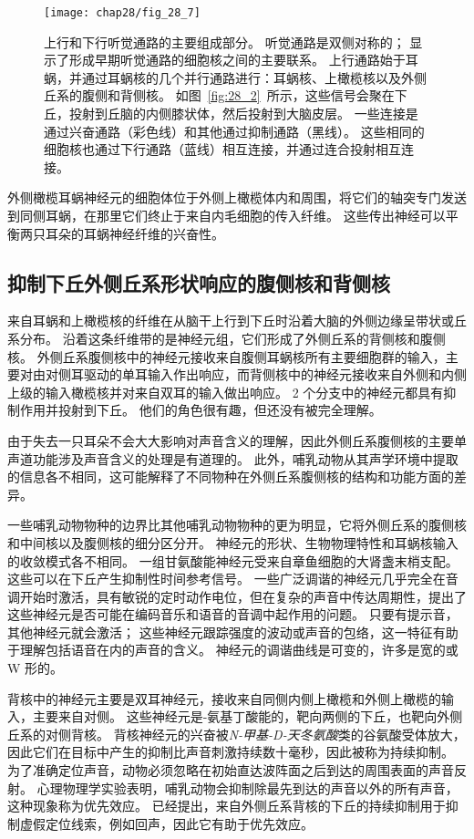 \begin{figure}[htbp]
	\centering
	\texttt{[image: chap28/fig\_28\_7]}
	\caption{上行和下行听觉通路的主要组成部分。
		听觉通路是双侧对称的；
		显示了形成早期听觉通路的细胞核之间的主要联系。
		上行通路始于耳蜗，并通过耳蜗核的几个并行通路进行：耳蜗核、上橄榄核以及外侧丘系的腹侧和背侧核。
		如图~\ref{fig:28_2}~所示，这些信号会聚在下丘，投射到丘脑的内侧膝状体，然后投射到大脑皮层。
		一些连接是通过兴奋通路（彩色线）和其他通过抑制通路（黑线）。 
		这些相同的细胞核也通过下行通路（蓝线）相互连接，并通过连合投射相互连接。}
	\label{fig:28_7}
\end{figure}


外侧橄榄耳蜗神经元的细胞体位于外侧上橄榄体内和周围，将它们的轴突专门发送到同侧耳蜗，在那里它们终止于来自内毛细胞的传入纤维。
这些传出神经可以平衡两只耳朵的耳蜗神经纤维的兴奋性\cite{darrow2006cochlear}。



\subsection{抑制下丘外侧丘系形状响应的腹侧核和背侧核}

来自耳蜗和上橄榄核的纤维在从脑干上行到下丘时沿着大脑的外侧边缘呈带状或丘系分布。
沿着这条纤维带的是神经元组，它们形成了外侧丘系的背侧核和腹侧核。
外侧丘系腹侧核中的神经元接收来自腹侧耳蜗核所有主要细胞群的输入，主要对由对侧耳驱动的单耳输入作出响应，而背侧核中的神经元接收来自外侧和内侧上级的输入橄榄核并对来自双耳的输入做出响应。
2 个分支中的神经元都具有抑制作用并投射到下丘。
他们的角色很有趣，但还没有被完全理解。


由于失去一只耳朵不会大大影响对声音含义的理解，因此外侧丘系腹侧核的主要单声道功能涉及声音含义的处理是有道理的。
此外，哺乳动物从其声学环境中提取的信息各不相同，这可能解释了不同物种在外侧丘系腹侧核的结构和功能方面的差异。


一些哺乳动物物种的边界比其他哺乳动物物种的更为明显，它将外侧丘系的腹侧核和中间核以及腹侧核的细分区分开。
神经元的形状、生物物理特性和耳蜗核输入的收敛模式各不相同。
一组甘氨酸能神经元受来自章鱼细胞的大肾盏末梢支配。 
这些可以在下丘产生抑制性时间参考信号。
一些广泛调谐的神经元几乎完全在音调开始时激活，具有敏锐的定时动作电位，但在复杂的声音中传达周期性，提出了这些神经元是否可能在编码音乐和语音的音调中起作用的问题。
只要有提示音，其他神经元就会激活； 
这些神经元跟踪强度的波动或声音的包络，这一特征有助于理解包括语音在内的声音的含义。
神经元的调谐曲线是可变的，许多是宽的或 W 形的。


背核中的神经元主要是双耳神经元，接收来自同侧内侧上橄榄和外侧上橄榄的输入，主要来自对侧。
这些神经元是\ce{$\gamma$}-氨基丁酸能的，靶向两侧的下丘，也靶向外侧丘系的对侧背核。
背核神经元的兴奋被\textit{N-甲基-D-天冬氨酸}类的谷氨酸受体放大，因此它们在目标中产生的抑制比声音刺激持续数十毫秒，因此被称为持续抑制。
为了准确定位声音，动物必须忽略在初始直达波阵面之后到达的周围表面的声音反射。
心理物理学实验表明，哺乳动物会抑制除最先到达的声音以外的所有声音，这种现象称为优先效应。
已经提出，来自外侧丘系背核的下丘的持续抑制用于抑制虚假定位线索，例如回声，因此它有助于优先效应。




